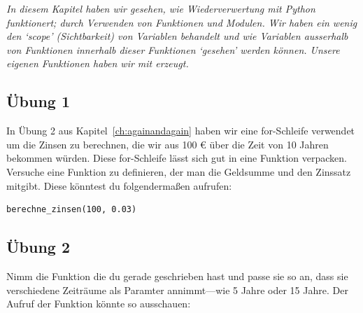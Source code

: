 \emph{In diesem Kapitel haben wir gesehen, wie Wiederverwertung mit Python funktionert; durch Verwenden von Funktionen und Modulen. Wir haben ein wenig den `scope' (Sichtbarkeit) von Variablen behandelt und wie Variablen ausserhalb von Funktionen innerhalb dieser Funktionen `gesehen' werden können. Unsere eigenen Funktionen haben wir mit  erzeugt.}

\subsection*{Übung 1}
In Übung 2 aus Kapitel~\ref{ch:againandagain} haben wir eine for-Schleife verwendet um die Zinsen zu berechnen, die wir aus 100 € über die Zeit von 10 Jahren bekommen würden. Diese for-Schleife lässt sich gut in eine Funktion verpacken. Versuche eine Funktion zu definieren, der man die Geldsumme und den Zinssatz mitgibt. Diese könntest du folgendermaßen aufrufen:

\begin{Verbatim}[frame=single]
berechne_zinsen(100, 0.03)
\end{Verbatim}

\subsection*{Übung 2}
Nimm die Funktion die du gerade geschrieben hast und passe sie so an, dass sie verschiedene Zeiträume als Paramter annimmt---wie 5 Jahre oder 15 Jahre. Der Aufruf der Funktion könnte so ausschauen:

